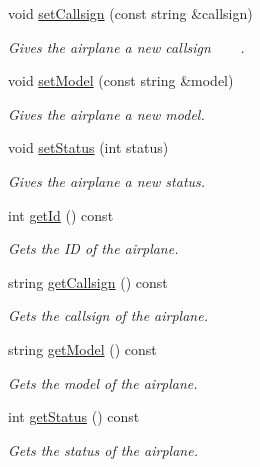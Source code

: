 \begin{DoxyCompactItemize}
void \mbox{\hyperlink{class_airplane_aed67dce16e3a4b1c1811e3344a039d90}{set\+Callsign}} (const string \&callsign)
\begin{DoxyCompactList}\small\item\em Gives the airplane a new callsign ~\newline
 ~\newline
. \end{DoxyCompactList}\item 
void \mbox{\hyperlink{class_airplane_aaeb19ae361b046ce543ad687aea63123}{set\+Model}} (const string \&model)
\begin{DoxyCompactList}\small\item\em Gives the airplane a new model. \end{DoxyCompactList}\item 
void \mbox{\hyperlink{class_airplane_a29e3db63862db02af13212800b89d602}{set\+Status}} (int status)
\begin{DoxyCompactList}\small\item\em Gives the airplane a new status. \end{DoxyCompactList}\item 
int \mbox{\hyperlink{class_airplane_aedac81e80b724d61d1c9df7311067ba8}{get\+Id}} () const
\begin{DoxyCompactList}\small\item\em Gets the ID of the airplane. \end{DoxyCompactList}\item 
string \mbox{\hyperlink{class_airplane_af7e30dcc3191147869b0208edf7000c5}{get\+Callsign}} () const
\begin{DoxyCompactList}\small\item\em Gets the callsign of the airplane. \end{DoxyCompactList}\item 
string \mbox{\hyperlink{class_airplane_a1431ee85bdcb3238cf6f0aefc51d8828}{get\+Model}} () const
\begin{DoxyCompactList}\small\item\em Gets the model of the airplane. \end{DoxyCompactList}\item 
int \mbox{\hyperlink{class_airplane_ac1247e4c17755c544a7fcd709ca44c14}{get\+Status}} () const
\begin{DoxyCompactList}\small\item\em Gets the status of the airplane. \end{DoxyCompactList}\item 

\end{DoxyCompactItemize}
